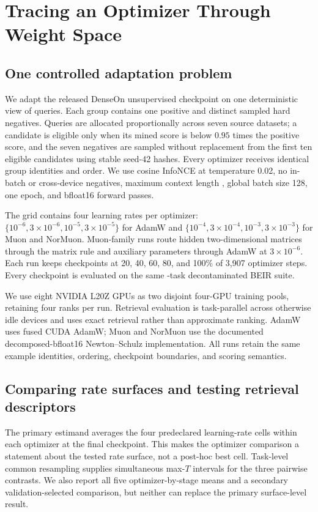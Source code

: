 \documentclass[11pt]{article}
\begin{document}
\section{Tracing an Optimizer Through Weight Space}

\subsection{One controlled adaptation problem}

We adapt the released DenseOn unsupervised checkpoint on one deterministic view of
\NumTrainingQueries{} queries. Each group contains one positive and \NumHardNegatives{} distinct
sampled hard negatives. Queries are allocated proportionally across seven source datasets; a
candidate is eligible only when its mined score is below $0.95$ times the positive score, and the
seven negatives are sampled without replacement from the first ten eligible candidates using
stable seed-42 hashes. Every optimizer receives identical group identities and order. We use cosine
InfoNCE at temperature 0.02, no in-batch or cross-device negatives, maximum context length
\ContextLength{}, global batch size 128, one epoch, and bfloat16 forward passes.

The grid contains four learning rates per optimizer: $\{10^{-6},3\!\times\!10^{-6},10^{-5},
3\!\times\!10^{-5}\}$ for AdamW and $\{10^{-4},3\!\times\!10^{-4},10^{-3},3\!\times\!10^{-3}\}$
for Muon and NorMuon. Muon-family runs route hidden two-dimensional matrices through the matrix
rule and auxiliary parameters through AdamW at $3\!\times\!10^{-6}$. Each run keeps checkpoints at
20, 40, 60, 80, and 100\% of 3,907 optimizer steps. Every checkpoint is evaluated on the same
\NumBEIRTasks-task decontaminated BEIR suite.

We use eight NVIDIA L20Z GPUs as two disjoint four-GPU training pools, retaining four ranks per
run. Retrieval evaluation is task-parallel across otherwise idle devices and uses exact retrieval
rather than approximate ranking. AdamW uses fused CUDA AdamW; Muon and NorMuon use the documented
decomposed-bfloat16 Newton--Schulz implementation. All runs retain the same example identities,
ordering, checkpoint boundaries, and scoring semantics.

\subsection{Comparing rate surfaces and testing retrieval descriptors}

The primary estimand averages the four predeclared learning-rate cells within each optimizer at the
final checkpoint. This makes the optimizer comparison a statement about the tested rate surface,
not a post-hoc best cell. Task-level common resampling supplies simultaneous max-$T$ intervals for
the three pairwise contrasts. We also report all five optimizer-by-stage means and a secondary
validation-selected comparison, but neither can replace the primary surface-level result.
\end{document}
